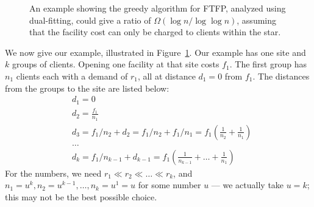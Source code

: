 \documentclass[oneside,final]{ucr}
\def\dsp{\def\baselinestretch{2.0}\large\normalsize}
\def\ssp{\def\baselinestretch{1.0}\large\normalsize}
\begin{document}
\ssp
\begin{figure}[ht]
  \centering
  \ssp
  \caption[The $\Omega(\log n / \log\log n)$ example for
  dual-fitting for {\FTFP}]{An example showing the greedy
    algorithm for FTFP, analyzed using dual-fitting, could
    give a ratio of $\Omega(\log n / \log\log n)$, assuming
    that the facility cost can only be charged to clients
    within the star.}
  \dsp
  \label{fig:greedy_lower_bound}
\end{figure}
\dsp

We now give our example, illustrated in
Figure~\ref{fig:greedy_lower_bound}. Our example has one
site and $k$ groups of clients. Opening one facility at that
site costs $f_1$. The first group has $n_1$ clients each
with a demand of $r_1$, all at distance $d_1 = 0$ from
$f_1$. The distances from the groups to the site are listed
below:
\begin{align*}
  &d_1 = 0\\
  &d_2 = \frac{f_1}{n_1}\\
  &d_3 = f_1/n_2 + d_2 = f_1/n_2 + f_1/n_1 = f_1 (\frac{1}{n_2} + \frac{1}{n_1})\\
  &\ldots\\
  &d_k = f_1/n_{k-1} + d_{k-1} = f_1 (\frac{1}{n_{k-1}} + \ldots + \frac{1}{n_1})
\end{align*}
For the numbers, we need $r_1 \ll r_2 \ll \ldots \ll r_k$,
and $n_1 = u^k, n_2 = u^{k-1}, \ldots, n_k = u^1 = u$
for some number $u$ --- we actually take $u=k$; this may not
be the best possible choice.
\end{document}
